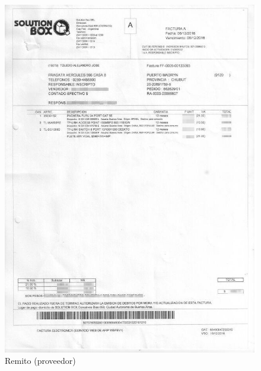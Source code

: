 \documentclass[12pt]{extarticle}
\begin{document}
    \begin{figure}[h]
    \includegraphics[scale=0.8]{images/atinformatica-remito1.jpg}
    \caption{Remito (proveedor)}
    \end{figure}

\end{document}
